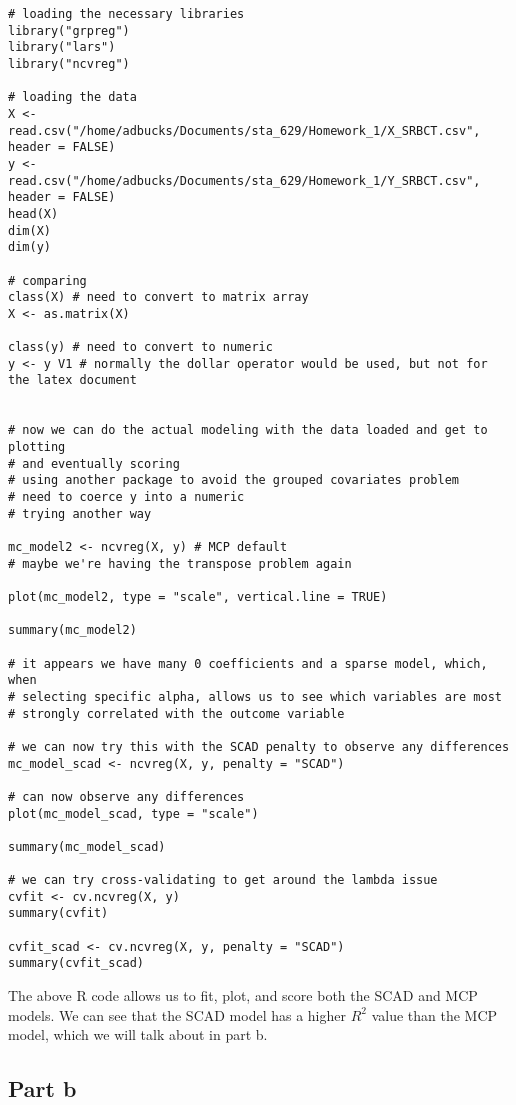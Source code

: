 \documentclass[12pt, letterpaper]{article}
\begin{document}
\begin{verbatim} 
# loading the necessary libraries 
library("grpreg")
library("lars")
library("ncvreg")

# loading the data 
X <- read.csv("/home/adbucks/Documents/sta_629/Homework_1/X_SRBCT.csv", header = FALSE)
y <- read.csv("/home/adbucks/Documents/sta_629/Homework_1/Y_SRBCT.csv", header = FALSE) 
head(X)
dim(X)
dim(y)

# comparing 
class(X) # need to convert to matrix array 
X <- as.matrix(X)

class(y) # need to convert to numeric
y <- y V1 # normally the dollar operator would be used, but not for the latex document 


# now we can do the actual modeling with the data loaded and get to plotting
# and eventually scoring 
# using another package to avoid the grouped covariates problem 
# need to coerce y into a numeric 
# trying another way 

mc_model2 <- ncvreg(X, y) # MCP default 
# maybe we're having the transpose problem again

plot(mc_model2, type = "scale", vertical.line = TRUE)

summary(mc_model2)

# it appears we have many 0 coefficients and a sparse model, which, when 
# selecting specific alpha, allows us to see which variables are most 
# strongly correlated with the outcome variable

# we can now try this with the SCAD penalty to observe any differences
mc_model_scad <- ncvreg(X, y, penalty = "SCAD")

# can now observe any differences 
plot(mc_model_scad, type = "scale")

summary(mc_model_scad)

# we can try cross-validating to get around the lambda issue 
cvfit <- cv.ncvreg(X, y)
summary(cvfit)

cvfit_scad <- cv.ncvreg(X, y, penalty = "SCAD")
summary(cvfit_scad)
\end{verbatim}

The above R code allows us to fit, plot, and score both the SCAD and MCP models. We can see that the SCAD model has a higher $R^2$ value than the MCP model, which we will talk about in part b. 

\subsection{Part b} 
\end{document}
